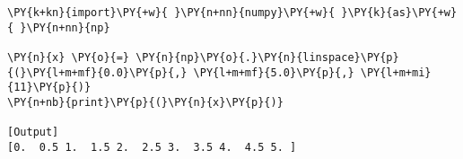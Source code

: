 \begin{Verbatim}[label=\makebox{\href{https://github.com/unipi-physics-labs/statnotes/tree/main/snippy/np.linspace.py}{https://github.com/.../np.linspace.py}},commandchars=\\\{\}]
\PY{k+kn}{import}\PY{+w}{ }\PY{n+nn}{numpy}\PY{+w}{ }\PY{k}{as}\PY{+w}{ }\PY{n+nn}{np}

\PY{n}{x} \PY{o}{=} \PY{n}{np}\PY{o}{.}\PY{n}{linspace}\PY{p}{(}\PY{l+m+mf}{0.0}\PY{p}{,} \PY{l+m+mf}{5.0}\PY{p}{,} \PY{l+m+mi}{11}\PY{p}{)}
\PY{n+nb}{print}\PY{p}{(}\PY{n}{x}\PY{p}{)}

[Output]
[0.  0.5 1.  1.5 2.  2.5 3.  3.5 4.  4.5 5. ]
\end{Verbatim}
